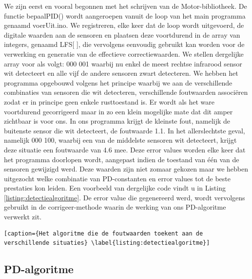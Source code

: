 We zijn eerst en vooral begonnen met het schrijven van de Motor-bibliotheek. De functie bepaalPID() wordt aangeroepen vanuit de loop van het main programma genaamd voerUit.ino. We registreren, elke keer dat de loop wordt uitgevoerd, de digitale waarden aan de sensoren en plaatsen deze voortdurend in de array van integers, genaamd LFS[ ], die vervolgens eenvoudig gebruikt kan worden voor de verwerking en generatie van de effectieve correctiewaarden. We stellen dergelijke array voor als volgt: 000 001 waarbij nu enkel de meest rechtse infrarood sensor wit detecteert en alle vijf de andere sensoren zwart detecteren. We hebben het programma opgebouwd volgens het principe waarbij we aan de verschillende combinaties van sensoren die wit detecteren, verschillende foutwaarden associ\"eren zodat er in principe geen enkele rusttoestand is. Er wordt als het ware voortdurend gecorrigeerd maar in zo een klein mogelijke mate dat dit amper zichtbaar is voor ons. In ons programma krijgt de kleinste fout, namelijk de buitenste sensor die wit detecteert, de foutwaarde 1.1. In het allerslechtste geval, namelijk 000 100, waarbij een van de middelste sensoren wit detecteert, krijgt deze situatie een foutwaarde van 4.6 mee. Deze error values worden elke keer dat het programma doorlopen wordt, aangepast indien de toestand van \'e\'en van de sensoren gewijzigd werd. Deze waarden zijn niet zomaar gekozen maar we hebben uitgezocht welke combinatie van PD-constanten en error values tot de beste prestaties kon leiden. Een voorbeeld van dergelijke code vindt u in Listing \ref{listing:detectiealgoritme}. De error value die gegenereerd werd, wordt vervolgens gebruikt in de corrigeer-methode waarin de werking van ons PD-algoritme verwerkt zit.


\begin{lstlisting}[caption={Het algoritme die de foutwaarden toekent aan de verschillende situaties} \label{listing:detectiealgoritme}]
\end{lstlisting}

\subsection{PD-algoritme}

